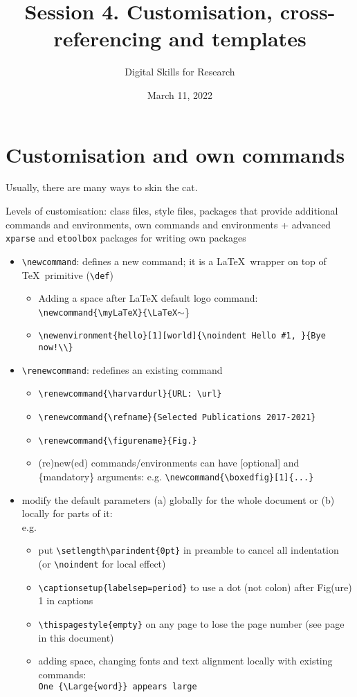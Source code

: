 \documentclass[a4paper,11pt]{article}
\title{Session 4. Customisation, cross-referencing and templates}
\author{Digital Skills for Research}
\date{March 11, 2022}
\newcommand{\myLaTeX}{\LaTeX~}
\renewcommand*{\figurename}{Fig.}
\newcommand{\boxedfig}[1]{%
	\setlength{\fboxsep}{5pt}%
	\setlength{\fboxrule}{3pt}%
	\fbox{\texttt{[image: \#1]}}%
}
\begin{document}
\maketitle
\tableofcontents

\section{Customisation and own commands}\label{sec:own}


Usually, there are many ways to skin the \hypertarget{wd:random}{cat}.

Levels of customisation: 
class files, style files, packages that provide additional commands and environments, own commands and environments + advanced \texttt{xparse} and \texttt{etoolbox} packages for writing own packages

\begin{itemize}
	\item \verb|\newcommand|: defines a new command; it is a \myLaTeX wrapper on top of \TeX~primitive (\verb|\def|) 
	\begin{itemize}
		\item Adding a space after LaTeX default logo command: \\
		\verb|\newcommand{\myLaTeX}{\LaTeX|$\sim$\}
		\item \verb|\newenvironment{hello}[1][world]{\noindent Hello #1, }{Bye now!\\}|
	\end{itemize}
	\item \verb|\renewcommand|: redefines an existing command
	\begin{itemize}
		\item \verb|\renewcommand{\harvardurl}{URL: \url}|
		\item \verb|\renewcommand{\refname}{Selected Publications 2017-2021}|
		\item \verb|\renewcommand{\figurename}{Fig.}|
		\item (re)new(ed) commands/environments can have [optional] and \{mandatory\} arguments: e.g. \verb|\newcommand{\boxedfig}[1]{...}|
		
	\end{itemize}
	\item modify the default parameters (a) globally for the whole document or (b) locally for parts of it: \\ e.g. 
	\begin{itemize}
		\item put \verb|\setlength\parindent{0pt}| in preamble to cancel all indentation (or \verb|\noindent| for local effect)
		\item \verb|\captionsetup{labelsep=period}| to use a dot (not colon) after Fig(ure) 1 in captions
		\item \verb|\thispagestyle{empty}| on any page to lose the page number (see page \pageref{pg:empty} in this document)
		\item adding space, changing fonts and text alignment locally with existing commands: \\ 
		\verb|One {\Large{word}} appears large|
	\end{itemize}
	
\end{itemize}
\end{document}
